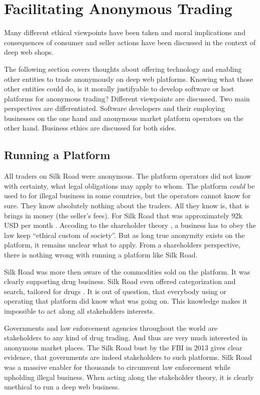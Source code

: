 \section{Facilitating Anonymous Trading}
\label{tech}

Many different ethical viewpoints have been taken and moral implications and consequences of consumer and seller actions have been discussed in the context of deep web shops.

The following section covers thoughts about offering technology and enabling other entities to trade anonymously on deep web platforms. Knowing what those other entities could do, is it morally justifyable to develop software or host platforms for anonymous trading? Different viewpoints are discussed. Two main perspectives are differentiated. Software developers and their employing businesses on the one hand and anonymous market platform operators on the other hand. Business ethics are discussed for both sides.

\subsection{Running a Platform}

All traders on Silk Road were anonymous. The platform operators did not know with certainty, what legal obligations may apply to whom. The platform \emph{could} be used to for illegal business in some countries, but the operators cannot know for sure. They know absolutely nothing about the traders. All they know is, that is brings in money (the seller's fees). For Silk Road that was approximately 92k USD per month \cite{silkroad2013}. Accoding to the shareholder theory \cite{shareholder}, a business has to obey the law keep ``ethical custom of society''. But as long true anonymity exists on the platform, it remains unclear what to apply. From a shareholders perspective, there is nothing wrong with running a platform like Silk Road.

Silk Road was more then aware of the commodities sold on the platform. It was clearly supporting drug business. Silk Road even offered categorization and search, tailored for drugs \cite{silkroad2013}. It is out of question, that everybody using or operating that platform did know what was going on. This knowledge makes it impossible to act along all stakeholders interests.

Governments and law enforcement agencies throughout the world are stakeholders to any kind of drug trading. And thus are very much interested in anonymous market places. The Silk Road bust by the FBI in 2013 gives clear evidence, that governments are indeed stakeholders to such platforms. Silk Road was a massive enabler for thousands to circumvent law enforcement while upholding illegal business. When acting along the stakeholder theory, it is clearly unethical to run a deep web business.

